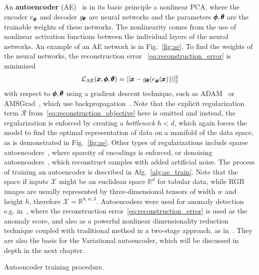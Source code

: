 An \textbf{autoencoder} (AE)~\cite{kramer1991nonlinear} is in its basic principle a nonlinear PCA, where the encoder $e_{\pmb{{\phi}}}$ and decoder $g_{\pmb{{\theta}}}$ are neural networks and the parameters $\pmb{{\phi}},\pmb{{\theta}}$ are the trainable weights of these networks. The nonlinearity comes from the use of nonlinear activation functions between the individual layers of the neural networks. An example of an AE network is in Fig.~\ref{fig:ae}.  To find the weights of the neural networks, the reconstruction error ~\eqref{eq:reconstruction_error} is minimized 
\begin{equation} \label{eq:ae_objective}
\mathcal{L}_{\text{AE}}(\pmb{{x}},\pmb{{\phi}},\pmb{{\theta}}) = \vert \vert \pmb{{x}} - g_{\pmb{{\theta}}}(e_{\pmb{{\phi}}}(\pmb{{x}})) \vert \vert_2^2
\end{equation}
with respect to $\pmb{{\phi}},\pmb{{\theta}}$ using a gradient descent technique, such as ADAM~\cite{kingma2014adam} or AMSGrad~\cite{reddi2019convergence}, which use backpropagation~\cite{werbos1982applications}. Note that the explicit regularization term $\mathcal{R}$ from~\eqref{eq:reconstruction_objective} here is omitted and instead, the regularization is enforced by creating a \textit{bottleneck} $h < d$, which again forces the model to find the optimal representation of data on a manifold of the data space, as is demonstrated in Fig.~\ref{fig:ae}. Other types of regularizations include sparse autoencoders~\cite{deng2013sparse}, where sparsity of encodings is enforced, or denoising autoencoders~\cite{lu2013speech}, which reconstruct samples with added artificial noise. The process of training an autoencoder is described in Alg.~\ref{alg:ae_train}. Note that the space if inputs $\mathcal{X}$ might be an euclidean space $\mathbb{R}^d$ for tabular data, while RGB images are usually represented by three-dimensional tensors of width $w$ and height $h$, therefore $\mathcal{X} = \mathbb{R}^{h,w,3}$. Autoencoders were used for anomaly detection e.g. in~\cite{sakurada2014anomaly,thompson2002implicit}, where the reconstruction error~\eqref{eq:reconstruction_error} is used as the anomaly score, and also as a powerful nonlinear dimensionality reduction technique coupled with traditional method in a two-stage approach, as in~\cite{erfani2016high, amarbayasgalan2018unsupervised}. They are also the basis for the Variational autoencoder, which will be discussed in depth in the next chapter.

\begin{algorithm}
\caption{Autoencoder training procedure.}
\label{alg:ae_train}
\end{algorithm}

